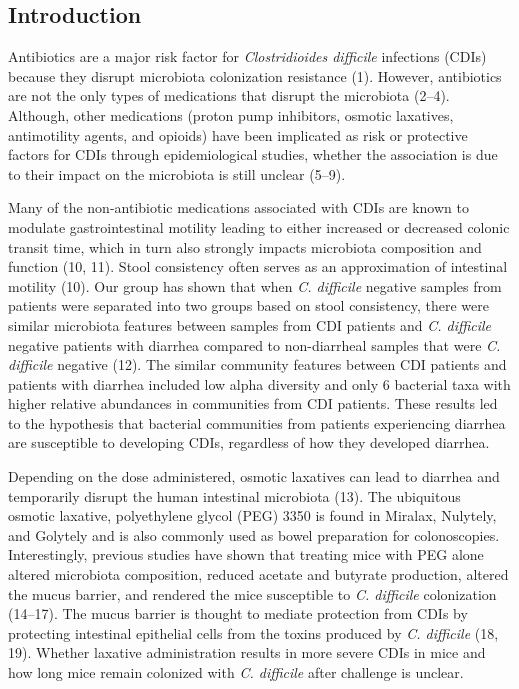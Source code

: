 \documentclass[
  11pt,
]{article}
\begin{document}
\newpage

\hypertarget{introduction}{%
\subsection{Introduction}\label{introduction}}

Antibiotics are a major risk factor for \emph{Clostridioides difficile}
infections (CDIs) because they disrupt microbiota colonization
resistance (1). However, antibiotics are not the only types of
medications that disrupt the microbiota (2--4). Although, other
medications (proton pump inhibitors, osmotic laxatives, antimotility
agents, and opioids) have been implicated as risk or protective factors
for CDIs through epidemiological studies, whether the association is due
to their impact on the microbiota is still unclear (5--9).

Many of the non-antibiotic medications associated with CDIs are known to
modulate gastrointestinal motility leading to either increased or
decreased colonic transit time, which in turn also strongly impacts
microbiota composition and function (10, 11). Stool consistency often
serves as an approximation of intestinal motility (10). Our group has
shown that when \emph{C. difficile} negative samples from patients were
separated into two groups based on stool consistency, there were similar
microbiota features between samples from CDI patients and \emph{C.
difficile} negative patients with diarrhea compared to non-diarrheal
samples that were \emph{C. difficile} negative (12). The similar
community features between CDI patients and patients with diarrhea
included low alpha diversity and only 6 bacterial taxa with higher
relative abundances in communities from CDI patients. These results led
to the hypothesis that bacterial communities from patients experiencing
diarrhea are susceptible to developing CDIs, regardless of how they
developed diarrhea.

Depending on the dose administered, osmotic laxatives can lead to
diarrhea and temporarily disrupt the human intestinal microbiota (13).
The ubiquitous osmotic laxative, polyethylene glycol (PEG) 3350 is found
in Miralax, Nulytely, and Golytely and is also commonly used as bowel
preparation for colonoscopies. Interestingly, previous studies have
shown that treating mice with PEG alone altered microbiota composition,
reduced acetate and butyrate production, altered the mucus barrier, and
rendered the mice susceptible to \emph{C. difficile} colonization
(14--17). The mucus barrier is thought to mediate protection from CDIs
by protecting intestinal epithelial cells from the toxins produced by
\emph{C. difficile} (18, 19). Whether laxative administration results in
more severe CDIs in mice and how long mice remain colonized with
\emph{C. difficile} after challenge is unclear.
\end{document}
